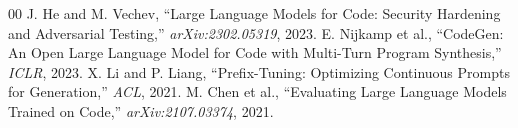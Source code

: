 \documentclass[conference]{IEEEtran}
\begin{document}
\begin{thebibliography}{00}
 J. He and M. Vechev, ``Large Language Models for Code: Security Hardening and Adversarial Testing,'' \textit{arXiv:2302.05319}, 2023.
 E. Nijkamp et al., ``CodeGen: An Open Large Language Model for Code with Multi-Turn Program Synthesis,'' \textit{ICLR}, 2023.
 X. Li and P. Liang, ``Prefix-Tuning: Optimizing Continuous Prompts for Generation,'' \textit{ACL}, 2021.
 M. Chen et al., ``Evaluating Large Language Models Trained on Code,'' \textit{arXiv:2107.03374}, 2021.
\end{thebibliography}
\end{document}
